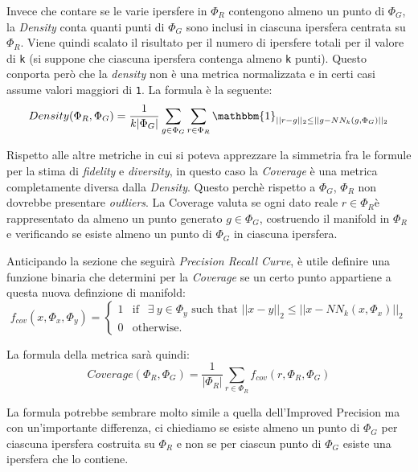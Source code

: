 Invece che contare se le varie ipersfere in $\Phi_R$ contengono almeno un punto di $\Phi_G$, la \textit{Density} conta quanti punti di $\Phi_G$ sono inclusi in ciascuna ipersfera centrata su $\Phi_R$. Viene quindi scalato il risultato per il numero di ipersfere totali per il valore di \texttt{k} (si suppone che ciascuna ipersfera contenga almeno \texttt{k} punti).
Questo conporta però che la \textit{density} non è una metrica normalizzata e in certi casi assume valori maggiori di \texttt{1}. La formula è la seguente: 
\begin{equation}
    Density(\Phi_R, \Phi_G) = \frac{1}{k|\Phi_G|} \sum_{g \in \Phi_G} \sum_{r \in \Phi_R} \mathbbm{1}_{||r - g||_2 \leq ||g - NN_k(g, \Phi_G)||_2}
\end{equation}

Rispetto alle altre metriche in cui si poteva apprezzare la simmetria fra le formule per la stima di \textit{fidelity} e \textit{diversity}, in questo caso la \textit{Coverage} è una metrica completamente diversa dalla \textit{Density}. Questo perchè rispetto a $\Phi_G$, $\Phi_R$ non dovrebbe presentare \textit{outliers}.
La Coverage valuta se ogni dato reale \(r \in \Phi_R \)​ è rappresentato da almeno un punto generato \(g \in \Phi_G \)​, costruendo il manifold in \(\Phi_R\) e verificando se esiste almeno un punto di \(\Phi_G\) in ciascuna ipersfera. 

Anticipando la sezione che seguirà \textit{Precision Recall Curve}, è utile definire una funzione binaria che determini per la \textit{Coverage} se un certo punto appartiene a questa nuova definzione di manifold:
\begin{equation}
    f_{cov}(x, \Phi_x, \Phi_y) = 
    \begin{cases}
        1 & \text{if }~~ \exists ~ y \in \Phi_y \text{ such that } ||x - y||_2 \leq ||x - NN_k(x, \Phi_x)||_2 \\
        0 & \text{otherwise.}
    \end{cases}
\end{equation}

La formula della metrica sarà quindi:
\begin{equation}
    Coverage(\Phi_R, \Phi_G) = \frac{1}{|\Phi_R|} \sum_{r \in \Phi_R} f_{cov}(r, \Phi_R, \Phi_G)
\end{equation}

La formula potrebbe sembrare molto simile a quella dell'Improved Precision ma con un'importante differenza, ci chiediamo se esiste almeno un punto di $\Phi_G$ per ciascuna ipersfera costruita su $\Phi_R$ e non se per ciascun punto di $\Phi_G$ esiste una ipersfera che lo contiene. 

